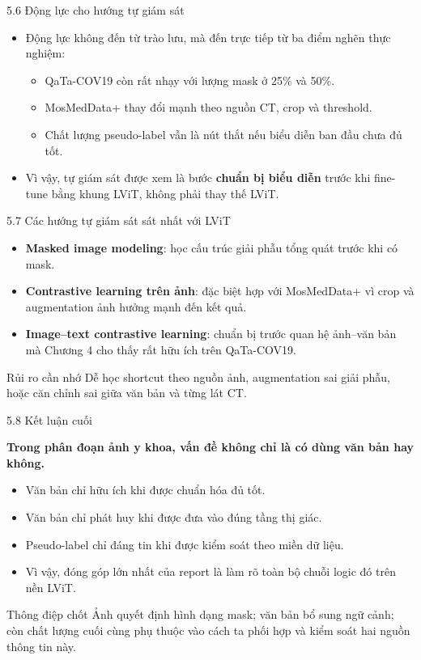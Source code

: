 \documentclass[aspectratio=169,11pt]{beamer}
\newcommand{\reportclaim}[1]{%
  \vspace{0.08cm}
  {\large\bfseries\color{accentblue}#1\par}
  \vspace{0.06cm}
}
\begin{document}
\begin{frame}{5.6 Động lực cho hướng tự giám sát}
  \begin{itemize}
    \item Động lực không đến từ trào lưu, mà đến trực tiếp từ ba điểm nghẽn thực nghiệm:
      \begin{itemize}
        \item QaTa-COV19 còn rất nhạy với lượng mask ở 25\% và 50\%.
        \item MosMedData+ thay đổi mạnh theo nguồn CT, crop và threshold.
        \item Chất lượng pseudo-label vẫn là nút thắt nếu biểu diễn ban đầu chưa đủ tốt.
      \end{itemize}
    \item Vì vậy, tự giám sát được xem là bước \textbf{chuẩn bị biểu diễn} trước khi fine-tune bằng khung LViT, không phải thay thế LViT.
  \end{itemize}
\end{frame}

\begin{frame}{5.7 Các hướng tự giám sát sát nhất với LViT}
  \begin{itemize}
    \item \textbf{Masked image modeling}: học cấu trúc giải phẫu tổng quát trước khi có mask.
    \item \textbf{Contrastive learning trên ảnh}: đặc biệt hợp với MosMedData+ vì crop và augmentation ảnh hưởng mạnh đến kết quả.
    \item \textbf{Image--text contrastive learning}: chuẩn bị trước quan hệ ảnh--văn bản mà Chương 4 cho thấy rất hữu ích trên QaTa-COV19.
  \end{itemize}
  \begin{block}{Rủi ro cần nhớ}
    Dễ học shortcut theo nguồn ảnh, augmentation sai giải phẫu, hoặc căn chỉnh sai giữa văn bản và từng lát CT.
  \end{block}
\end{frame}

\begin{frame}{5.8 Kết luận cuối}
  \reportclaim{Trong phân đoạn ảnh y khoa, vấn đề không chỉ là có dùng văn bản hay không.}
  \begin{itemize}
    \item Văn bản chỉ hữu ích khi được chuẩn hóa đủ tốt.
    \item Văn bản chỉ phát huy khi được đưa vào đúng tầng thị giác.
    \item Pseudo-label chỉ đáng tin khi được kiểm soát theo miền dữ liệu.
    \item Vì vậy, đóng góp lớn nhất của report là làm rõ toàn bộ chuỗi logic đó trên nền LViT.
  \end{itemize}
  \begin{block}{Thông điệp chốt}
    Ảnh quyết định hình dạng mask; văn bản bổ sung ngữ cảnh; còn chất lượng cuối cùng phụ thuộc vào cách ta phối hợp và kiểm soát hai nguồn thông tin này.
  \end{block}
\end{frame}
\end{document}
